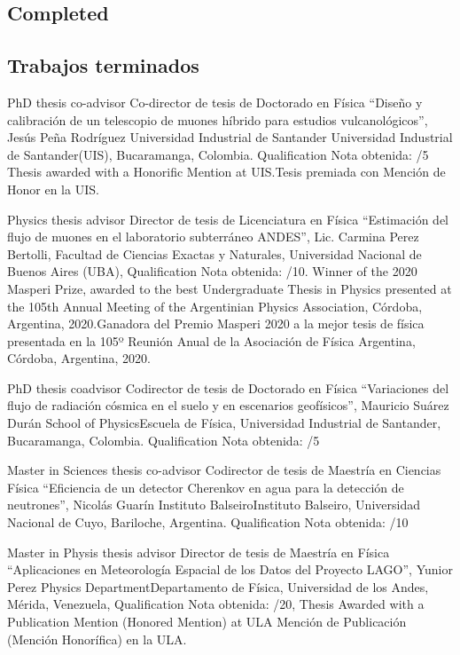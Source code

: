 \ifeng
\subsection*{Completed}
\else
\subsection*{Trabajos terminados}
\fi

\ifeng
PhD thesis co-advisor
 \else
Co-director de tesis de Doctorado en Física
 \fi
``Diseño y calibración de un telescopio de muones híbrido para estudios vulcanológicos'', Jesús Peña Rodríguez \at \ifeng Universidad Industrial de Santander \else Universidad Industrial de Santander\fi (UIS), Bucaramanga, Colombia. \ifeng Qualification \else Nota obtenida: /5 \ifeng Thesis awarded with a Honorific Mention at UIS.\else Tesis premiada con Mención de Honor en la UIS.\fi

\ifeng
Physics thesis advisor
 \else
Director de tesis de Licenciatura en Física
 \fi
``Estimación del flujo de muones en el laboratorio subterráneo ANDES'', Lic. Carmina Perez Bertolli, \at Facultad de Ciencias Exactas y Naturales, Universidad Nacional de Buenos Aires (UBA), \ifeng Qualification \else Nota obtenida: /10. \ifeng Winner of the 2020 Masperi Prize, awarded to the best Undergraduate Thesis in Physics presented at the 105th Annual Meeting of the Argentinian Physics Association, Córdoba, Argentina, 2020.\else Ganadora del Premio Masperi 2020 a la mejor tesis de física presentada en la 105º Reunión Anual de la Asociación de Física Argentina, Córdoba, Argentina, 2020. \fi 

\ifeng
PhD thesis coadvisor
 \else
Codirector de tesis de Doctorado en Física
 \fi
``Variaciones del flujo de radiación cósmica en el suelo y en escenarios geofísicos'', Mauricio Suárez Durán \at \ifeng School of Physics\else Escuela de Física\fi, Universidad Industrial de Santander, Bucaramanga, Colombia. \ifeng Qualification \else Nota obtenida: /5

\ifeng
Master in Sciences thesis co-advisor
 \else
Codirector de tesis de Maestría en Ciencias Física
 \fi
``Eficiencia de un detector Cherenkov en agua para la detección de neutrones'', Nicolás Guarín \at \ifeng Instituto Balseiro\else Instituto Balseiro\fi, Universidad Nacional de Cuyo, Bariloche, Argentina. \ifeng Qualification \else Nota obtenida: /10

\ifeng
Master in Physis thesis advisor
 \else
Director de tesis de Maestría en Física
 \fi
 ``Aplicaciones en Meteorología Espacial de los Datos del Proyecto LAGO'', Yunior Perez \at \ifeng Physics Department\else Departamento de Física\fi, Universidad de los Andes, Mérida, Venezuela, \ifeng Qualification \else Nota obtenida: /20, \ifeng Thesis Awarded with a Publication Mention (Honored Mention) at ULA \else Mención de Publicación (Mención Honorífica) en la ULA\fi.

